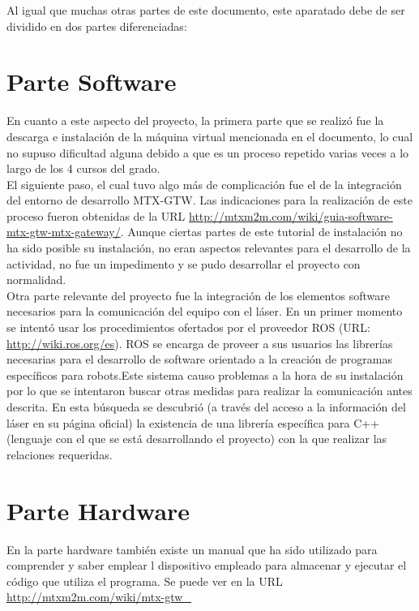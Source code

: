 
Al igual que muchas otras partes de este documento, este aparatado debe de ser dividido en dos partes diferenciadas:

\section{Parte Software}

En cuanto a este aspecto del proyecto, la primera parte que se realizó fue la descarga e instalación de la máquina virtual mencionada en el documento, lo cual no supuso dificultad alguna debido a que es un proceso repetido varias veces a lo largo de los 4 cursos del grado.\\

El siguiente paso, el cual tuvo algo más de complicación fue el de la integración del entorno de desarrollo MTX-GTW. Las indicaciones para la realización de este proceso fueron obtenidas de la URL \url{http://mtxm2m.com/wiki/guia-software-mtx-gtw-mtx-gateway/}. Aunque ciertas partes de este tutorial de instalación no ha sido posible su instalación, no eran aspectos relevantes para el desarrollo de la actividad, no fue un impedimento y se pudo desarrollar el proyecto con normalidad.\\

Otra parte relevante del proyecto fue la integración de los elementos software necesarios para la comunicación del equipo con el láser. En un primer momento se intentó usar los procedimientos ofertados por el proveedor ROS (URL: \url{http://wiki.ros.org/es}). ROS se encarga de proveer a sus usuarios las librerías necesarias para el desarrollo de software orientado a la creación de programas específicos para robots.Este sistema causo problemas a la hora de su instalación por lo que se intentaron buscar otras medidas para realizar la comunicación antes descrita. En esta búsqueda se descubrió (a través del acceso a la información del láser en su página oficial) la existencia de una librería específica para  C++ (lenguaje con el que se está desarrollando el proyecto) con la que realizar las relaciones requeridas.

\section{Parte Hardware}

En la parte hardware también existe un manual que ha sido utilizado para comprender y saber emplear l dispositivo empleado para almacenar y ejecutar el código que utiliza el programa. Se puede ver en la URL \url{ http://mtxm2m.com/wiki/mtx-gtw_}\\

